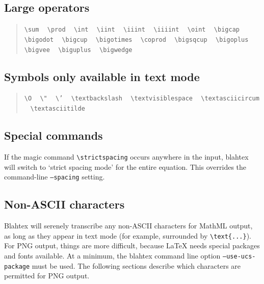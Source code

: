 \documentclass{article}
\newcommand{\texcommand}[1]{\textbackslash{}#1}
\newcommand{\spacer}{\,\,\, \hfil}
\newcommand{\lastspacer}{\hfill\hfill\hfill}
\newenvironment{mylist}{\begin{quote}}{\end{quote}}
\begin{document}
\subsection{Large operators}

\begin{mylist}
\texttt{\texcommand{sum}} \spacer
\texttt{\texcommand{prod}} \spacer
\texttt{\texcommand{int}} \spacer
\texttt{\texcommand{iint}} \spacer
\texttt{\texcommand{iiint}} \spacer
\texttt{\texcommand{iiiint}} \spacer
\texttt{\texcommand{oint}} \spacer
\texttt{\texcommand{bigcap}} \spacer
\texttt{\texcommand{bigodot}} \spacer
\texttt{\texcommand{bigcup}} \spacer
\texttt{\texcommand{bigotimes}} \spacer
\texttt{\texcommand{coprod}} \spacer
\texttt{\texcommand{bigsqcup}} \spacer
\texttt{\texcommand{bigoplus}} \spacer
\texttt{\texcommand{bigvee}} \spacer
\texttt{\texcommand{biguplus}} \spacer
\texttt{\texcommand{bigwedge}} \lastspacer
\end{mylist}

\subsection{Symbols only available in text mode}

\begin{mylist}
\texttt{\texcommand{O}} \spacer
\texttt{\texcommand{"}} \spacer
\texttt{\texcommand{'}} \spacer
\texttt{\texcommand{textbackslash}} \spacer
\texttt{\texcommand{textvisiblespace}} \spacer
\texttt{\texcommand{textasciicircum}} \spacer
\texttt{\texcommand{textasciitilde}} \lastspacer
\end{mylist}


\subsection{Special commands}\label{sec:special-commands}

If the magic command \texttt{\texcommand{strictspacing}} occurs anywhere in the input, blahtex will switch to `strict spacing mode' for the entire equation. This overrides the command-line \texttt{--spacing} setting.


\subsection{Non-ASCII characters}\label{sec:non-ascii-characters}

Blahtex will serenely transcribe any non-ASCII characters for MathML output, as long as they appear in text mode (for example, surrounded by \texttt{\texcommand{text}\{...\}}). For PNG output, things are more difficult, because \LaTeX{} needs special packages and fonts available. At a minimum, the blahtex command line option \texttt{--use-ucs-package} must be used. The following sections describe which characters are permitted for PNG output.
\end{document}
